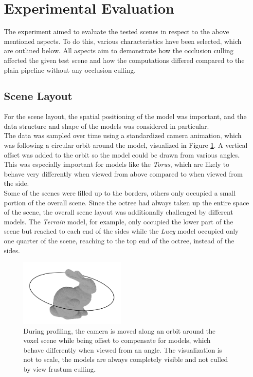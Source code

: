 \section{Experimental Evaluation} \label{sec-experimental-evaluation}

The experiment aimed to evaluate the tested scenes in respect to the above mentioned aspects. To do this, 
various characteristics have been selected, which are outlined below. All aspects aim to demonstrate how 
the occlusion culling affected the given test scene and how the computations differed compared to the plain 
pipeline without any occlusion culling. 


\subsection*{Scene Layout} \label{subsec-scene-layout}

For the scene layout, the spatial positioning of the model was important, and the data structure and shape 
of the models was considered in particular. \\

\noindent
The data was sampled over time using a standardized camera animation, which was following a circular orbit 
around the model, visualized in Figure \ref{fig:test-anim-camera-path}. A vertical offset was added to the orbit 
so the model could be drawn from various angles. This was especially important for models like the \emph{Torus}, 
which are likely to behave very differently when viewed from above compared to when viewed from the side. \\

\noindent
Some of the scenes were filled up to the borders, others only occupied a small portion of the overall scene. 
Since the octree had always taken up the entire space of the scene, the overall scene layout was additionally 
challenged by different models. The \emph{Terrain} model, for example, only occupied the lower part of the 
scene but reached to each end of the sides while the \emph{Lucy} model occupied only one quarter of the scene, 
reaching to the top end of the octree, instead of the sides. \\

\begin{figure}[h]
    \centering
    \includegraphics[width=200px]{images/graphics/test-anim-camera-path.jpg}
    \caption{During profiling, the camera is moved along an orbit around the voxel scene while being offset to compensate 
    for models, which behave differently when viewed from an angle. The visualization is not to scale, the models 
    are always completely visible and not culled by view frustum culling.}
    \label{fig:test-anim-camera-path}
\end{figure}

